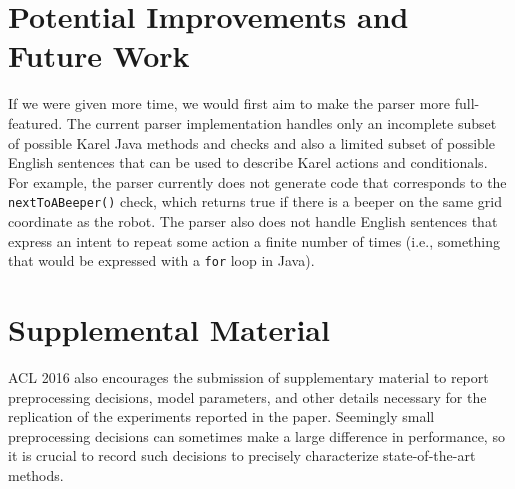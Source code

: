 \documentclass[11pt]{article}
\begin{document}
\begin{table}[ht]
\centering
{}
\caption{Detailed breakdown of test case categories and successes in each category.}
\label{tab:results-breakdown}
\end{table}


\section{Potential Improvements and Future Work}
If we were given more time, we would first aim to make the parser more full-featured. The current
parser implementation handles only an incomplete subset of possible Karel Java methods and checks
and also a limited subset of possible English sentences that can be used to describe Karel actions
and conditionals. For example, the parser currently does not generate code that corresponds to the
\texttt{nextToABeeper()} check, which returns true if there is a beeper on the same grid coordinate
as the robot. The parser also does not handle English sentences that express an intent to repeat
some action a finite number of times (i.e., something that would be expressed with a \texttt{for}
loop in Java).


%
%



\appendix

\section{Supplemental Material}
\label{sec:supplemental}
ACL 2016 also encourages the submission of supplementary material
to report preprocessing decisions, model parameters, and other details
necessary for the replication of the experiments reported in the
paper. Seemingly small preprocessing decisions can sometimes make
a large difference in performance, so it is crucial to record such
decisions to precisely characterize state-of-the-art methods.
\end{document}
